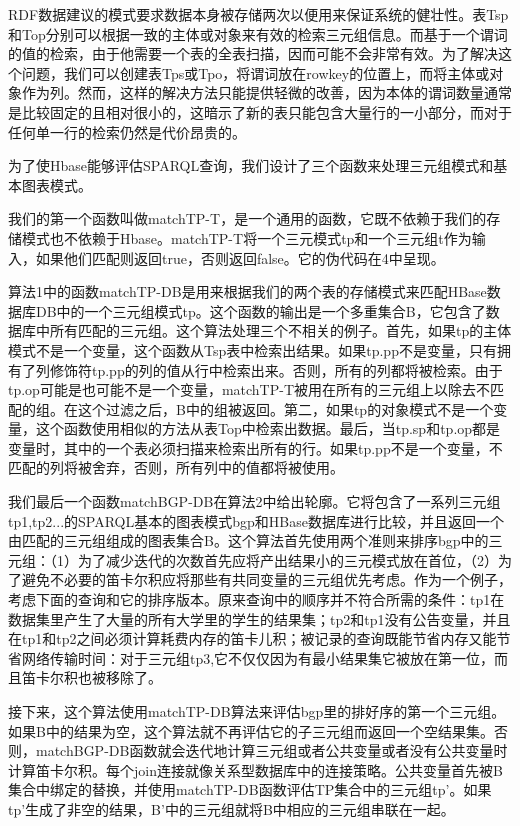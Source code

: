 RDF数据建议的模式要求数据本身被存储两次以便用来保证系统的健壮性。表Tsp和Top分别可以根据一致的主体或对象来有效的检索三元组信息。而基于一个谓词的值的检索，由于他需要一个表的全表扫描，因而可能不会非常有效。为了解决这个问题，我们可以创建表Tps或Tpo，将谓词放在rowkey的位置上，而将主体或对象作为列。然而，这样的解决方法只能提供轻微的改善，因为本体的谓词数量通常是比较固定的且相对很小的，这暗示了新的表只能包含大量行的一小部分，而对于任何单一行的检索仍然是代价昂贵的。

为了使Hbase能够评估SPARQL查询，我们设计了三个函数来处理三元组模式和基本图表模式。

我们的第一个函数叫做matchTP-T，是一个通用的函数，它既不依赖于我们的存储模式也不依赖于Hbase。matchTP-T将一个三元模式tp和一个三元组t作为输入，如果他们匹配则返回true，否则返回false。它的伪代码在4中呈现。

算法1中的函数matchTP-DB是用来根据我们的两个表的存储模式来匹配HBase数据库DB中的一个三元组模式tp。这个函数的输出是一个多重集合B，它包含了数据库中所有匹配的三元组。这个算法处理三个不相关的例子。首先，如果tp的主体模式不是一个变量，这个函数从Tsp表中检索出结果。如果tp.pp不是变量，只有拥有了列修饰符tp.pp的列的值从行中检索出来。否则，所有的列都将被检索。由于tp.op可能是也可能不是一个变量，matchTP-T被用在所有的三元组上以除去不匹配的组。在这个过滤之后，B中的组被返回。第二，如果tp的对象模式不是一个变量，这个函数使用相似的方法从表Top中检索出数据。最后，当tp.sp和tp.op都是变量时，其中的一个表必须扫描来检索出所有的行。如果tp.pp不是一个变量，不匹配的列将被舍弃，否则，所有列中的值都将被使用。

  我们最后一个函数matchBGP-DB在算法2中给出轮廓。它将包含了一系列三元组tp1,tp2...的SPARQL基本的图表模式bgp和HBase数据库进行比较，并且返回一个由匹配的三元组组成的图表集合B。这个算法首先使用两个准则来排序bgp中的三元组：（1）为了减少迭代的次数首先应将产出结果小的三元模式放在首位，（2）为了避免不必要的笛卡尔积应将那些有共同变量的三元组优先考虑。作为一个例子，考虑下面的查询和它的排序版本。原来查询中的顺序并不符合所需的条件：tp1在数据集里产生了大量的所有大学里的学生的结果集；tp2和tp1没有公告变量，并且在tp1和tp2之间必须计算耗费内存的笛卡儿积；被记录的查询既能节省内存又能节省网络传输时间：对于三元组tp3,它不仅仅因为有最小结果集它被放在第一位，而且笛卡尔积也被移除了。

  接下来，这个算法使用matchTP-DB算法来评估bgp里的排好序的第一个三元组。如果B中的结果为空，这个算法就不再评估它的子三元组而返回一个空结果集。否则，matchBGP-DB函数就会迭代地计算三元组或者公共变量或者没有公共变量时计算笛卡尔积。每个join连接就像关系型数据库中的连接策略。公共变量首先被B集合中绑定的替换，并使用matchTP-DB函数评估TP集合中的三元组tp'。如果tp'生成了非空的结果，B'中的三元组就将B中相应的三元组串联在一起。

